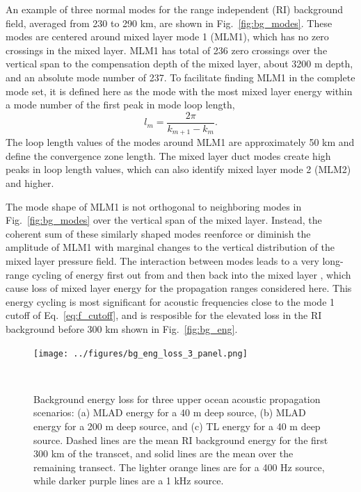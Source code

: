 \documentclass[preprint,NumberedRefs]{JASA}
\begin{document}
An example of three normal modes for the range independent (RI) background field, averaged from 230 to 290 km, are shown in Fig.~\ref{fig:bg_modes}. These modes are centered around mixed layer mode 1 (MLM1), which has no zero crossings in the mixed layer. MLM1 has total of 236 zero crossings over the vertical span to the compensation depth of the mixed layer, about 3200 m depth, and an absolute mode number of 237. To facilitate finding MLM1 in the complete mode set, it is defined here as the mode with the most mixed layer energy within a mode number of the first peak in mode loop length\citep{jensen2011computational},
\begin{equation}
    l_{m} = \frac{2 \pi}{k_{m+1} - k_m}.
    \label{eq:loop_length}
\end{equation}
The loop length values of the modes around MLM1 are approximately 50 km and define the convergence zone length. The mixed layer duct modes create high peaks in loop length values, which can also identify mixed layer mode 2 (MLM2) and higher.

The mode shape of MLM1 is not orthogonal to neighboring modes in Fig.~\ref{fig:bg_modes} over the vertical span of the mixed layer. Instead, the coherent sum of these similarly shaped modes reenforce or diminish the amplitude of MLM1 with marginal changes to the vertical distribution of the mixed layer pressure field. The interaction between modes leads to a very long-range cycling of energy first out from and then back into the mixed layer \citep{porter93,colosi2020observations}, which cause loss of mixed layer energy for the propagation ranges considered here. This energy cycling is most significant for acoustic frequencies close to the mode 1 cutoff of Eq.~\eqref{eq:f_cutoff}, and is resposible for the elevated loss in the RI background before 300 km shown in Fig.~\ref{fig:bg_eng}.

\begin{figure}
\texttt{[image: ../figures/bg\_eng\_loss\_3\_panel.png]}
        \caption{Background energy loss for three upper ocean acoustic propagation scenarios: (a) MLAD energy for a 40 m deep source, (b) MLAD energy for a 200 m deep source, and (c) TL energy for a 40 m deep source. Dashed lines are the mean RI background energy for the first 300 km of the transcet, and solid lines are the mean over the remaining transect. The lighter orange lines are for a 400 Hz source, while darker purple lines are a 1 kHz source.}
    \label{fig:eng_bg_3}
\end{figure}
\end{document}
